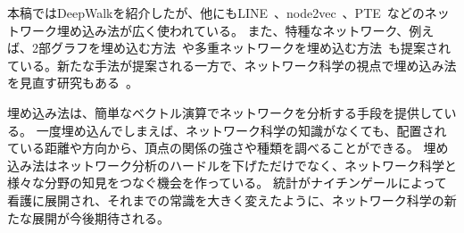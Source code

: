 \documentclass[J]{scitrans}
\begin{document}
本稿ではDeepWalkを紹介したが、他にもLINE~\cite{Tang2015}、node2vec~\cite{Grover2016}、PTE~\cite{Tang2015a}などのネットワーク埋め込み法が広く使われている。 
また、特種なネットワーク、例えば、2部グラフを埋め込む方法~\cite{Gao2018}や多重ネットワークを埋め込む方法~\cite{Dong2017}も提案されている。新たな手法が提案される一方で、ネットワーク科学の視点で埋め込み法を見直す研究もある~\cite{Seshadhri2020,Tandon2020}。

埋め込み法は、簡単なベクトル演算でネットワークを分析する手段を提供している。
一度埋め込んでしまえば、ネットワーク科学の知識がなくても、配置されている距離や方向から、頂点の関係の強さや種類を調べることができる。
埋め込み法はネットワーク分析のハードルを下げただけでなく、ネットワーク科学と様々な分野の知見をつなぐ機会を作っている。
統計がナイチンゲールによって看護に展開され、それまでの常識を大きく変えたように、ネットワーク科学の新たな展開が今後期待される。
\end{document}
